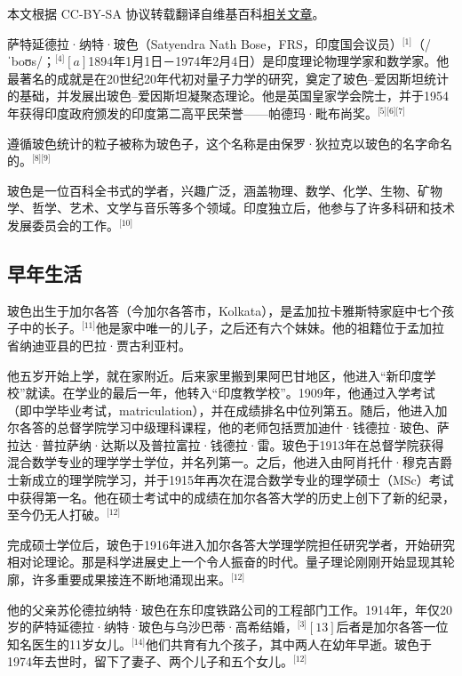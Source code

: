 
本文根据 CC-BY-SA 协议转载翻译自维基百科\href{https://en.wikipedia.org/wiki/Satyendra_Nath_Bose}{相关文章}。

萨特延德拉·纳特·玻色（Satyendra Nath Bose，FRS，印度国会议员）\(^\text{[1]}\)（/ˈboʊs/；\(^\text{[4]}[a]\)1894年1月1日－1974年2月4日）是印度理论物理学家和数学家。他最著名的成就是在20世纪20年代初对量子力学的研究，奠定了玻色–爱因斯坦统计的基础，并发展出玻色–爱因斯坦凝聚态理论。他是英国皇家学会院士，并于1954年获得印度政府颁发的印度第二高平民荣誉——帕德玛·毗布尚奖。\(^\text{[5][6][7]}\)

遵循玻色统计的粒子被称为玻色子，这个名称是由保罗·狄拉克以玻色的名字命名的。\(^\text{[8][9]}\)

玻色是一位百科全书式的学者，兴趣广泛，涵盖物理、数学、化学、生物、矿物学、哲学、艺术、文学与音乐等多个领域。印度独立后，他参与了许多科研和技术发展委员会的工作。\(^\text{[10]}\)
\subsection{早年生活}
玻色出生于加尔各答（今加尔各答市，Kolkata），是孟加拉卡雅斯特家庭中七个孩子中的长子。\(^\text{[11]}\)他是家中唯一的儿子，之后还有六个妹妹。他的祖籍位于孟加拉省纳迪亚县的巴拉·贾古利亚村。

他五岁开始上学，就在家附近。后来家里搬到果阿巴甘地区，他进入“新印度学校”就读。在学业的最后一年，他转入“印度教学校”。1909年，他通过入学考试（即中学毕业考试，matriculation），并在成绩排名中位列第五。随后，他进入加尔各答的总督学院学习中级理科课程，他的老师包括贾加迪什·钱德拉·玻色、萨拉达·普拉萨纳·达斯以及普拉富拉·钱德拉·雷。玻色于1913年在总督学院获得混合数学专业的理学学士学位，并名列第一。之后，他进入由阿肖托什·穆克吉爵士新成立的理学院学习，并于1915年再次在混合数学专业的理学硕士（MSc）考试中获得第一名。他在硕士考试中的成绩在加尔各答大学的历史上创下了新的纪录，至今仍无人打破。\(^\text{[12]}\)

完成硕士学位后，玻色于1916年进入加尔各答大学理学院担任研究学者，开始研究相对论理论。那是科学进展史上一个令人振奋的时代。量子理论刚刚开始显现其轮廓，许多重要成果接连不断地涌现出来。\(^\text{[12]}\)

他的父亲苏伦德拉纳特·玻色在东印度铁路公司的工程部门工作。1914年，年仅20岁的萨特延德拉·纳特·玻色与乌沙巴蒂·高希结婚，\(^\text{[3]}[13]\)后者是加尔各答一位知名医生的11岁女儿。\(^\text{[14]}\)他们共育有九个孩子，其中两人在幼年早逝。玻色于1974年去世时，留下了妻子、两个儿子和五个女儿。\(^\text{[12]}\)

